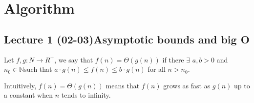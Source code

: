 \chapter[Algorithm]{Algorithm}
\section[Lecture 1 (02-03) -- {Asymptotic bounds and big O}]{Lecture 1 (02-03)Asymptotic bounds and big O}
\begin{definition}[big-Theta notation(=)]{}
    Let $f,g: N \rightarrow R^+$, we say that $f(n)=\Theta(g(n))$ if there $\exists$  $a,b>0$ and $n_0\in \mathbb{N}$such that $a\cdot g(n) \leq f(n) \leq b\cdot g(n)$ for all $n >n_0$.
    \end{definition}
    Intuitively, $f(n) = \Theta(g(n))$ means that $f(n)$ grows as fast as $g(n)$ up to a constant when $n$ tends to infinity.

